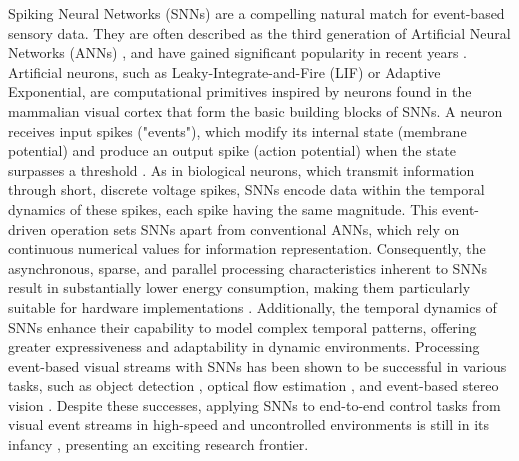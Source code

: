 \documentclass{article}
\begin{document}
Spiking Neural Networks (SNNs) are a compelling natural match for event-based sensory data. They are often described as the third generation of Artificial Neural Networks (ANNs) \cite{maassNetworksSpikingNeurons1997a}, and have gained significant popularity in recent years \cite{gallegoEventbasedVisionSurvey2022}. Artificial neurons, such as Leaky-Integrate-and-Fire (LIF) or Adaptive Exponential, are computational primitives inspired by neurons found in the mammalian visual cortex that form the basic building blocks of SNNs. A neuron receives input spikes ("events"), which modify its internal state (membrane potential) and produce an output spike (action potential) when the state surpasses a threshold \cite{gallegoEventbasedVisionSurvey2022}. As in biological neurons, which transmit information through short, discrete voltage spikes, SNNs encode data within the temporal dynamics of these spikes, each spike having the same magnitude. This event-driven operation sets SNNs apart from conventional ANNs, which rely on continuous numerical values for information representation. Consequently, the asynchronous, sparse, and parallel processing characteristics inherent to SNNs result in substantially lower energy consumption, making them particularly suitable for hardware implementations \cite{farsaLowCostHighSpeedNeuromorphic2019, siddiqueLowCostNeuromorphic2023}. Additionally, the temporal dynamics of SNNs enhance their capability to model complex temporal patterns, offering greater expressiveness and adaptability in dynamic environments. Processing event-based visual streams with SNNs has been shown to be successful in various tasks, such as object detection \cite{iaboniEventbasedSpikingNeural2024}, optical flow estimation \cite{cuadradoOpticalFlowEstimation2023}, and event-based stereo vision \cite{osswaldSpikingNeuralNetwork2017}. Despite these successes, applying SNNs to end-to-end control tasks from visual event streams in high-speed and uncontrolled environments is still in its infancy \cite{stroobantsNeuromorphicAttitudeEstimation2025, paredes-vallesFullyNeuromorphicVision2023b, onizTrajectoryControlQuadrotors2024}, presenting an exciting research frontier. 
\end{document}
